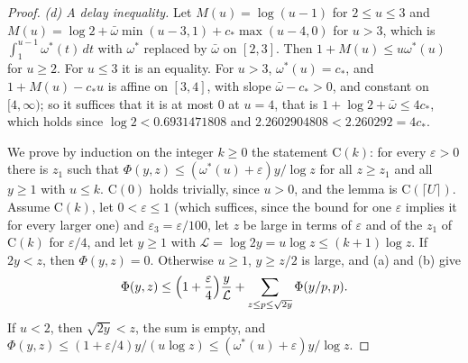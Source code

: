 \documentclass[11pt]{article}
\numberwithin{equation}{section}
\begin{document}
\begin{proof}
\emph{(d) A delay inequality.} Let $M(u) = \log(u - 1)$ for $2 \le u \le 3$ and
$M(u) = \log 2 + \bar\omega \min(u - 3, 1) + c_* \max(u - 4, 0)$ for $u > 3$, which is $\int_1^{u - 1} \omega^*(t)\, dt$
with
$\omega^*$ replaced by $\bar\omega$ on $[2, 3]$. Then $1 + M(u) \le u \omega^*(u)$ for $u \ge 2$. For $u \le 3$ it is an
equality. For $u > 3$, $\omega^*(u) = c_*$, and $1 + M(u) - c_* u$ is affine on $[3, 4]$, with slope $\bar\omega - c_* >
0$, and
constant on $[4, \infty)$; so it suffices that it is at most $0$ at $u = 4$, that is $1 + \log 2 + \bar\omega \le 4c_*$,
which
holds since $\log 2 < 0.6931471808$ and $2.2602904808 < 2.260292 = 4c_*$.

We prove by induction on the integer $k \ge 0$ the statement $\mathrm C(k)$: for every $\varepsilon > 0$ there is
$z_1$ such that $\Phi(y, z) \le (\omega^*(u) + \varepsilon) y/\log z$ for all $z \ge z_1$ and all $y \ge 1$ with
$u \le k$. $\mathrm C(0)$ holds trivially, since $u > 0$, and the lemma is $\mathrm C(\lceil U \rceil)$. Assume
$\mathrm C(k)$, let $0 < \varepsilon \le 1$ (which suffices, since the bound for one $\varepsilon$ implies it for every
larger one) and $\varepsilon_3 = \varepsilon/100$, let $z$ be large in terms of
$\varepsilon$ and of the $z_1$ of $\mathrm C(k)$ for $\varepsilon/4$, and let $y \ge 1$ with
$\mathcal L = \log 2y = u \log z \le (k + 1) \log z$. If $2y < z$, then $\Phi(y, z) = 0$. Otherwise $u \ge 1$, $y \ge
z/2$ is large, and (a) and (b) give
\[
  \Phi(y, z) \le \Bigl(1 + \frac\varepsilon4\Bigr) \frac{y}{\mathcal L} + \sum_{z \le p \le \sqrt{2y}} \Phi(y/p, p).
\]
If $u < 2$, then $\sqrt{2y} < z$, the sum is empty, and
$\Phi(y, z) \le (1 + \varepsilon/4) y/(u \log z) \le (\omega^*(u) + \varepsilon) y/\log z$.


\end{proof}
\end{document}
